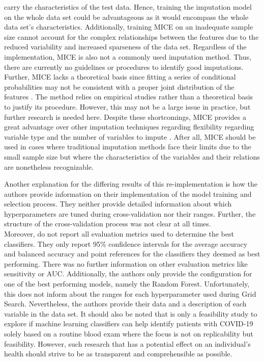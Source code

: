 carry the characteristics of the test data. Hence, training the imputation 
model on the whole data set could be advantageous as it would encompass the 
whole data set's characteristics. Additionally, training MICE on an inadequate 
sample size cannot account for the complex relationships between the 
features due to the reduced variability and increased sparseness of the data 
set.
Regardless of the implementation, MICE is also not a commonly used imputation 
method. Thus, there are currently no guidelines or procedures to identify 
good imputations. Further, MICE lacks a theoretical basis since fitting a 
series of conditional probabilities may not be consistent with a proper joint 
distribution of the features \cite{RN141}. The method relies on empirical 
studies rather than a 
theoretical basis to justify its procedure. However, this may not be a large 
issue in practice, but further research is needed here. Despite these 
shortcomings, MICE 
provides a great advantage over other imputation techniques regarding 
flexibility regarding variable type and the number of variables to impute 
\cite{RN141, RN142}. After all, MICE should be used in cases where traditional 
imputation methods face their limits due to the small sample size but where the 
characteristics of the variables and their relations are 
nonetheless recognizable.
\par
Another explanation for the differing results of this re-implementation is how 
the authors provide information on their implementation of the model 
training and selection process. They neither provide detailed 
information about which hyperparameters are tuned during cross-validation nor 
their ranges. Further, the structure of the cross-validation process was not 
clear at all times.
\\
Moreover, \citeauthor{RN127} do not report all evaluation metrics used to 
determine the best classifiers. They only report 95\% confidence intervals for 
the average accuracy and balanced accuracy and point references for the 
classifiers they deemed as best performing. There was no further information 
on other evaluation metrics like sensitivity or AUC. Additionally, the authors 
only provide the configuration for one of the best performing models, 
namely the Random Forest. Unfortunately, this does not inform about the ranges 
for each hyperparameter used during Grid Search.
Nevertheless, the authors provide their data and a description of each 
variable in the data set. It should also be noted that \cite{RN127} is only a 
feasibility study to explore if machine learning classifiers can help identify 
patients with COVID-19 solely based on a routine blood exam where the focus is 
not on replicability but feasibility. However, such research that has a 
potential effect on an individual's health should strive to be as transparent 
and comprehensible as possible.
